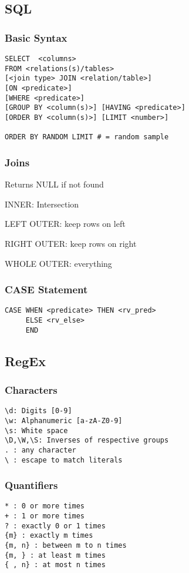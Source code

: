 \documentclass[8pt]{extarticle}
\begin{document}
\subsection*{SQL}
\subsubsection*{Basic Syntax}
\begin{verbatim}
SELECT  <columns>
FROM <relations(s)/tables>
[<join type> JOIN <relation/table>] 
[ON <predicate>]
[WHERE <predicate>]
[GROUP BY <column(s)>] [HAVING <predicate>]
[ORDER BY <column(s)>] [LIMIT <number>]

ORDER BY RANDOM LIMIT # = random sample
\end{verbatim}

\subsubsection*{Joins}
Returns NULL if not found

INNER: Intersection

LEFT OUTER: keep rows on left

RIGHT OUTER: keep rows on right

WHOLE OUTER: everything


\subsubsection*{CASE Statement}
\begin{verbatim}
CASE WHEN <predicate> THEN <rv_pred> 
     ELSE <rv_else>
     END
\end{verbatim}
\hline

\subsection*{RegEx}
\subsubsection*{Characters}
\begin{verbatim}
\d: Digits [0-9]
\w: Alphanumeric [a-zA-Z0-9]
\s: White space
\D,\W,\S: Inverses of respective groups
. : any character
\ : escape to match literals
\end{verbatim}

\subsubsection*{Quantifiers}
\begin{verbatim}
* : 0 or more times
+ : 1 or more times
? : exactly 0 or 1 times
{m} : exactly m times
{m, n} : between m to n times
{m, } : at least m times
{ , n} : at most n times
\end{verbatim}
\end{document}
